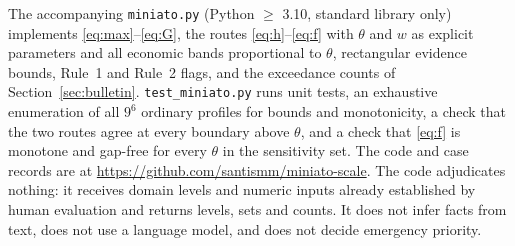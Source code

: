 \documentclass[11pt,a4paper]{article}
\begin{document}
The accompanying \texttt{miniato.py} (Python $\ge$ 3.10, standard library only) implements \eqref{eq:max}--\eqref{eq:G}, the routes \eqref{eq:h}--\eqref{eq:f} with $\theta$ and $w$ as explicit parameters and all economic bands proportional to $\theta$, rectangular evidence bounds, Rule~1 and Rule~2 flags, and the exceedance counts of Section~\ref{sec:bulletin}. \texttt{test\_miniato.py} runs unit tests, an exhaustive enumeration of all $9^{6}$ ordinary profiles for bounds and monotonicity, a check that the two routes agree at every boundary above $\theta$, and a check that \eqref{eq:f} is monotone and gap-free for every $\theta$ in the sensitivity set. The code and case records are at \url{https://github.com/santismm/miniato-scale}. The code adjudicates nothing: it receives domain levels and numeric inputs already established by human evaluation and returns levels, sets and counts. It does not infer facts from text, does not use a language model, and does not decide emergency priority.
\end{document}
